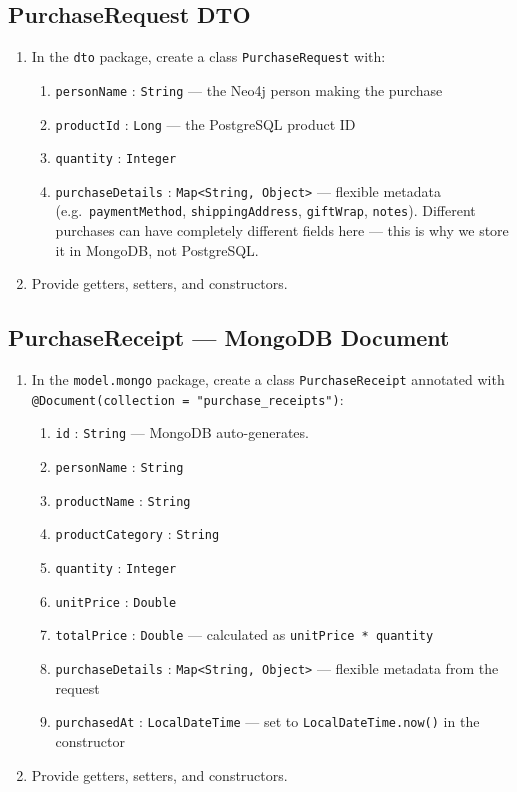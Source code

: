 \documentclass[a4paper]{article}
\begin{document}
\subsection*{PurchaseRequest DTO}
\begin{enumerate}
  \item In the \texttt{dto} package, create a class \texttt{PurchaseRequest} with:
    \begin{enumerate}
      \item \texttt{personName} : \texttt{String} --- the Neo4j person making the purchase
      \item \texttt{productId} : \texttt{Long} --- the PostgreSQL product ID
      \item \texttt{quantity} : \texttt{Integer}
      \item \texttt{purchaseDetails} : \texttt{Map<String, Object>} --- flexible metadata (e.g.\ \texttt{paymentMethod}, \texttt{shippingAddress}, \texttt{giftWrap}, \texttt{notes}). Different purchases can have completely different fields here --- this is why we store it in MongoDB, not PostgreSQL.
    \end{enumerate}
  \item Provide getters, setters, and constructors.
\end{enumerate}

\subsection*{PurchaseReceipt --- MongoDB Document}
\begin{enumerate}
  \item In the \texttt{model.mongo} package, create a class \texttt{PurchaseReceipt} annotated with \texttt{@Document(collection = "purchase\_receipts")}:
    \begin{enumerate}
      \item \texttt{id} : \texttt{String} --- MongoDB auto-generates.
      \item \texttt{personName} : \texttt{String}
      \item \texttt{productName} : \texttt{String}
      \item \texttt{productCategory} : \texttt{String}
      \item \texttt{quantity} : \texttt{Integer}
      \item \texttt{unitPrice} : \texttt{Double}
      \item \texttt{totalPrice} : \texttt{Double} --- calculated as \texttt{unitPrice * quantity}
      \item \texttt{purchaseDetails} : \texttt{Map<String, Object>} --- flexible metadata from the request
      \item \texttt{purchasedAt} : \texttt{LocalDateTime} --- set to \texttt{LocalDateTime.now()} in the constructor
    \end{enumerate}
  \item Provide getters, setters, and constructors.
\end{enumerate}
\end{document}

